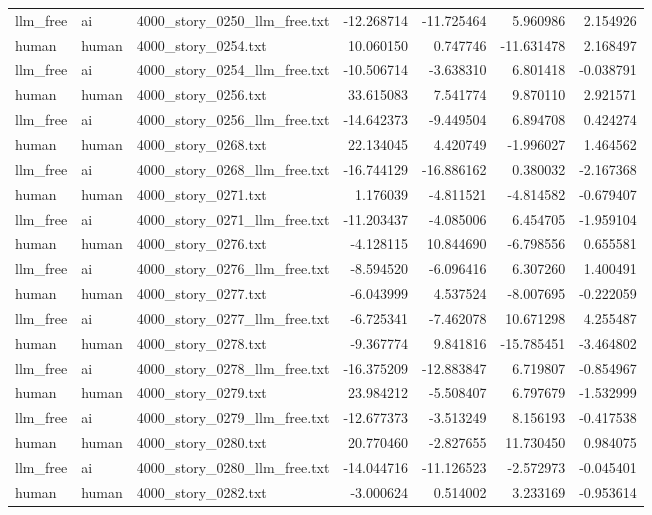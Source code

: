 \begin{longtable}{lllrrrr}
llm\_free & ai & 4000\_story\_0250\_llm\_free.txt & -12.268714 & -11.725464 & 5.960986 & 2.154926 \\
human & human & 4000\_story\_0254.txt & 10.060150 & 0.747746 & -11.631478 & 2.168497 \\
llm\_free & ai & 4000\_story\_0254\_llm\_free.txt & -10.506714 & -3.638310 & 6.801418 & -0.038791 \\
human & human & 4000\_story\_0256.txt & 33.615083 & 7.541774 & 9.870110 & 2.921571 \\
llm\_free & ai & 4000\_story\_0256\_llm\_free.txt & -14.642373 & -9.449504 & 6.894708 & 0.424274 \\
human & human & 4000\_story\_0268.txt & 22.134045 & 4.420749 & -1.996027 & 1.464562 \\
llm\_free & ai & 4000\_story\_0268\_llm\_free.txt & -16.744129 & -16.886162 & 0.380032 & -2.167368 \\
human & human & 4000\_story\_0271.txt & 1.176039 & -4.811521 & -4.814582 & -0.679407 \\
llm\_free & ai & 4000\_story\_0271\_llm\_free.txt & -11.203437 & -4.085006 & 6.454705 & -1.959104 \\
human & human & 4000\_story\_0276.txt & -4.128115 & 10.844690 & -6.798556 & 0.655581 \\
llm\_free & ai & 4000\_story\_0276\_llm\_free.txt & -8.594520 & -6.096416 & 6.307260 & 1.400491 \\
human & human & 4000\_story\_0277.txt & -6.043999 & 4.537524 & -8.007695 & -0.222059 \\
llm\_free & ai & 4000\_story\_0277\_llm\_free.txt & -6.725341 & -7.462078 & 10.671298 & 4.255487 \\
human & human & 4000\_story\_0278.txt & -9.367774 & 9.841816 & -15.785451 & -3.464802 \\
llm\_free & ai & 4000\_story\_0278\_llm\_free.txt & -16.375209 & -12.883847 & 6.719807 & -0.854967 \\
human & human & 4000\_story\_0279.txt & 23.984212 & -5.508407 & 6.797679 & -1.532999 \\
llm\_free & ai & 4000\_story\_0279\_llm\_free.txt & -12.677373 & -3.513249 & 8.156193 & -0.417538 \\
human & human & 4000\_story\_0280.txt & 20.770460 & -2.827655 & 11.730450 & 0.984075 \\
llm\_free & ai & 4000\_story\_0280\_llm\_free.txt & -14.044716 & -11.126523 & -2.572973 & -0.045401 \\
human & human & 4000\_story\_0282.txt & -3.000624 & 0.514002 & 3.233169 & -0.953614 \\

\end{longtable}
